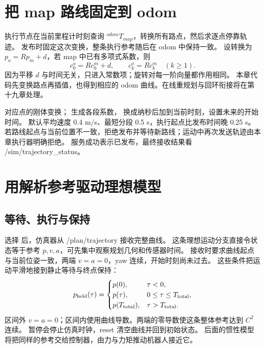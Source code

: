\section{把 map 路线固定到 odom}
执行节点在当前里程计时刻查询 $^{odom}T_{map}$，转换所有路点，然后求逐点停靠轨迹。
发布时固定这次变换，整条执行参考随后在 odom 中保持一致。
设转换为 $p_o=Rp_m+d$，若 map 中已有多项式系数，则
\begin{equation}c^o_0=Rc^m_0+d,\qquad c^o_k=Rc^m_k\quad(k\geq1).\end{equation}
因为平移 $d$ 与时间无关，只进入常数项；旋转对每一阶向量都作用相同。
本章代码先变换路点再插值，也得到相应的 odom 曲线。在线重规划与回环衔接将在第十九章处理。
\par\noindent\begin{minipage}{\linewidth}

\end{minipage}\par
{} 对应点的刚体变换； 生成各段系数，
 换成纳秒后加到当前时刻，设置未来的开始时间。
默认平均速度 0.4 m/s、最短分段 0.5 s，执行起点比发布时间晚 0.25 s。
若路线起点与当前位置不一致，拒绝发布并等待新路线；运动中再次发送轨迹由本章执行器明确拒绝。
服务成功表示已发布，最终接收结果看 /sim/trajectory\_status。

\section{用解析参考驱动理想模型}
\subsection{等待、执行与保持}
选择  后，仿真器从 /plan/trajectory 接收完整曲线。
这条理想运动分支直接令状态等于参考 $p,v,a$，可先集中观察规划几何和传感器时间。
接收时要求曲线起点与当前位姿一致，两端 $v=a=0$，yaw 连续，开始时刻尚未过去。
这些条件把运动平滑地接到静止等待与终点保持：
\begin{equation}
p_{\rm held}(\tau)=\begin{cases}
p(0),&\tau<0,\\p(\tau),&0\leq\tau\leq T_{\rm total},\\p(T_{\rm total}),&\tau>T_{\rm total}.
\end{cases}
\end{equation}
区间外 $v=a=0$；区间内使用曲线导数。两端的零导数使这条整体参考达到 $C^2$ 连续。
暂停会停止仿真时钟，reset 清空曲线并回到初始状态。
后面的惯性模型将把同样的参考交给控制器，由力与力矩推动机器人接近它。


